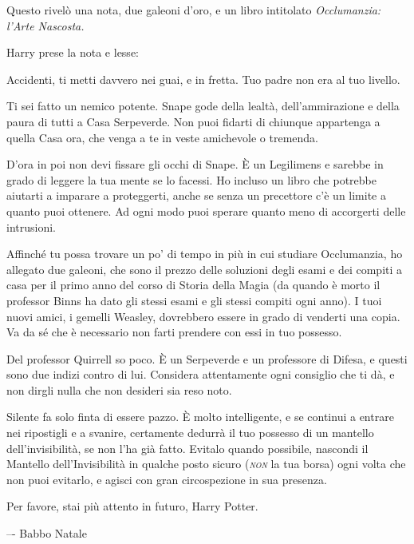 Questo rivelò una nota, due galeoni d’oro, e un libro intitolato \textit{Occlumanzia: l’Arte Nascosta.}

Harry prese la nota e lesse:

\vspace{1em}
\begin{addmargin}[3em]{3em}%
\begin{itpars}		
Accidenti, ti metti davvero nei guai, e in fretta. Tuo padre non era al tuo livello.

Ti sei fatto un nemico potente. Snape gode della lealtà, dell’ammirazione e della paura di tutti a Casa Serpeverde. Non puoi fidarti di chiunque appartenga a quella Casa ora, che venga a te in veste amichevole o tremenda.

D’ora in poi non devi fissare gli occhi di Snape. È un Legilimens e sarebbe in grado di leggere la tua mente se lo facessi. Ho incluso un libro che potrebbe aiutarti a imparare a proteggerti, anche se senza un precettore c’è un limite a quanto puoi ottenere. Ad ogni modo puoi sperare quanto meno di accorgerti delle intrusioni.

Affinché tu possa trovare un po’ di tempo in più in cui studiare Occlumanzia, ho allegato due galeoni, che sono il prezzo delle soluzioni degli esami e dei compiti a casa per il primo anno del corso di Storia della Magia (da quando è morto il professor Binns ha dato gli stessi esami e gli stessi compiti ogni anno). I tuoi nuovi amici, i gemelli Weasley, dovrebbero essere in grado di venderti una copia. Va da sé che è necessario non farti prendere con essi in tuo possesso.

Del professor Quirrell so poco. È un Serpeverde e un professore di Difesa, e questi sono due indizi contro di lui. Considera attentamente ogni consiglio che ti dà, e non dirgli nulla che non desideri sia reso noto.

Silente fa solo finta di essere pazzo. È molto intelligente, e se continui a entrare nei ripostigli e a svanire, certamente dedurrà il tuo possesso di un mantello dell’invisibilità, se non l’ha già fatto. Evitalo quando possibile, nascondi il Mantello dell’Invisibilità in qualche posto sicuro (\textsl{\textsc{non}} la tua borsa) ogni volta che non puoi evitarlo, e agisci con gran circospezione in sua presenza.

Per favore, stai più attento in futuro, Harry Potter.

–- Babbo Natale
\end{itpars}
\end{addmargin}
\vspace{1em}

